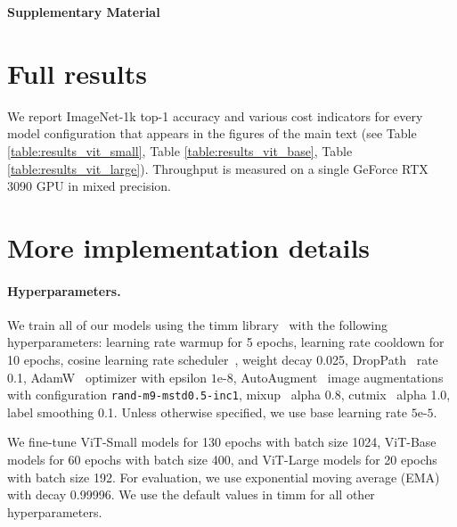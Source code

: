 \appendix

\renewcommand{\thetable}{A\arabic{table}}
\setcounter{table}{0}


\begin{center}
\LARGE
\textbf{Supplementary Material}
\end{center}

\hfill \break

\section{Full results}
We report ImageNet-1k top-1 accuracy and various cost indicators for every model configuration that appears in the figures of the main text (see Table \ref{table:results_vit_small}, Table \ref{table:results_vit_base}, Table \ref{table:results_vit_large}). Throughput is measured on a single GeForce RTX 3090 GPU in mixed precision.


\section{More implementation details}
\paragraph{Hyperparameters.} We train all of our models using the timm library~\cite{rw2019timm} with the following hyperparameters: learning rate warmup for 5 epochs, learning rate cooldown for 10 epochs, cosine learning rate scheduler~\cite{Loshchilov2016SGDRSG}, weight decay 0.025, DropPath~\cite{Huang2016DeepNW} rate 0.1, AdamW~\cite{Loshchilov2017DecoupledWD} optimizer with epsilon $1\text{e-}8$, AutoAugment~\cite{Cubuk2018AutoAugmentLA} image augmentations with configuration \verb|rand-m9-mstd0.5-inc1|, mixup~\cite{Zhang2017mixupBE} alpha 0.8, cutmix~\cite{Yun2019CutMixRS} alpha 1.0, label smoothing 0.1. Unless otherwise specified, we use base learning rate $5\text{e-}5$.

We fine-tune ViT-Small models for 130 epochs with batch size 1024, ViT-Base models for 60 epochs with batch size 400, and ViT-Large models for 20 epochs with batch size 192. For evaluation, we use exponential moving average (EMA)~\cite{Polyak1992AccelerationOS} with decay 0.99996. We use the default values in timm for all other hyperparameters.


\hfill \break

